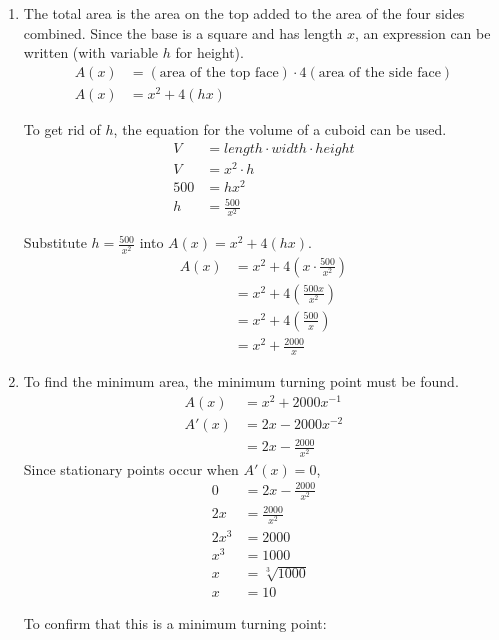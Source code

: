 \bigskip

\begin{enumerate}
	\item
	The total area is the area on the top added to the area of the four sides combined. Since the base is a square and has length $x$, an expression can be written (with variable $h$ for height).
	\begin{align*}
		A(x) &= \left(\text{area of the top face}\right) \cdot 4\left(\text{area of the side face}\right)\\
		A(x) &= x^2 + 4(hx)
	\end{align*}
	
	To get rid of $h$, the equation for the volume of a cuboid can be used.
	\begin{align*}
		V &= length \cdot width \cdot height\\
		V &= x^2 \cdot h\\
		500 &= h x^2\\
		h &= \frac{500}{x^2}
	\end{align*}
	
	Substitute $h = \frac{500}{x^2}$ into $A(x) = x^2 + 4(hx)$.
	\begin{align*}
		A(x) &= x^2 + 4\left(x \cdot \frac{500}{x^2}\right)\\
		&= x^2 + 4\left(\frac{500x}{x^2}\right)\\
		&= x^2 + 4\left(\frac{500}{x}\right)\\
		&= x^2 + \frac{2000}{x}
	\end{align*}
	
	\item 
	To find the minimum area, the minimum turning point must be found.
	\begin{align*}
		A(x) &= x^2+2000x^{-1}\\
		A'(x) &= 2x-2000x^{-2}\\
		&= 2x-\frac{2000}{x^2}
	\end{align*}
	Since stationary points occur when $A'(x)=0$,
	\begin{align*}
		0 &= 2x-\frac{2000}{x^2}\\
		2x &= \frac{2000}{x^2}\\
		2x^3 &= 2000\\
		x^3 &= 1000\\
		x &= \sqrt[3]{1000}\\
		x &= 10
	\end{align*}
	
	To confirm that this is a minimum turning point:
	

\end{enumerate}
